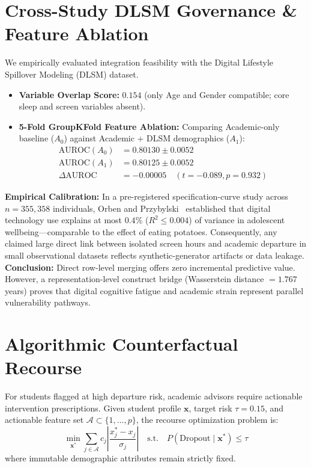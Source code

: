 \documentclass[10pt,journal,compsoc]{IEEEtran}
\begin{document}
\section{Cross-Study DLSM Governance \& Feature Ablation}

We empirically evaluated integration feasibility with the Digital Lifestyle Spillover Modeling (DLSM) dataset.
\begin{itemize}
    \item \textbf{Variable Overlap Score:} $0.154$ (only Age and Gender compatible; core sleep and screen variables absent).
    \item \textbf{5-Fold GroupKFold Feature Ablation:} Comparing Academic-only baseline ($A_0$) against Academic + DLSM demographics ($A_1$):
    \begin{align*}
    \text{AUROC}(A_0) &= 0.80130 \pm 0.0052 \\
    \text{AUROC}(A_1) &= 0.80125 \pm 0.0052 \\
    \Delta\text{AUROC} &= -0.00005 \quad (t = -0.089, p = 0.932)
    \end{align*}
\end{itemize}
\textbf{Empirical Calibration:} In a pre-registered specification-curve study across $n=355,358$ individuals, Orben and Przybylski~\cite{orben2019} established that digital technology use explains at most $0.4\%$ ($R^2 \le 0.004$) of variance in adolescent wellbeing---comparable to the effect of eating potatoes. Consequently, any claimed large direct link between isolated screen hours and academic departure in small observational datasets reflects synthetic-generator artifacts or data leakage.
\textbf{Conclusion:} Direct row-level merging offers zero incremental predictive value. However, a representation-level construct bridge (Wasserstein distance $= 1.767$ years) proves that digital cognitive fatigue and academic strain represent parallel vulnerability pathways.

\section{Algorithmic Counterfactual Recourse}
For students flagged at high departure risk, academic advisors require actionable intervention prescriptions. Given student profile $\mathbf{x}$, target risk $\tau = 0.15$, and actionable feature set $\mathcal{A} \subset \{1, \dots, p\}$, the recourse optimization problem is:
\begin{equation}
\min_{\mathbf{x}^*} \sum_{j \in \mathcal{A}} c_j \left|\frac{x_j^* - x_j}{\sigma_j}\right| \quad \text{s.t.} \quad P(\text{Dropout} \mid \mathbf{x}^*) \le \tau
\end{equation}
where immutable demographic attributes remain strictly fixed.
\end{document}
